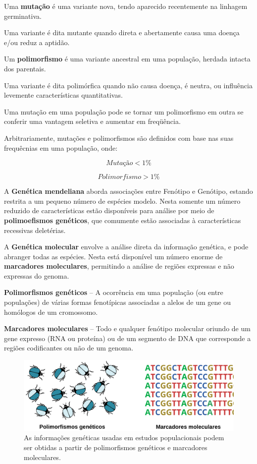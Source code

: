 \documentclass[
]{book}
\begin{document}
Uma \textbf{mutação} é uma variante nova, tendo aparecido recentemente na linhagem germinativa.

Uma variante é dita mutante quando direta e abertamente causa uma doença e/ou reduz a aptidão.

Um \textbf{polimorfismo} é uma variante ancestral em uma população, herdada intacta dos parentais.

Uma variante é dita polimórfica quando não causa doença, é neutra, ou influência levemente características quantitativas.

Uma mutação em uma população pode se tornar um polimorfismo em outra se conferir uma vantagem seletiva e aumentar em freqüência.

Arbitrariamente, mutações e polimorfismos são definidos com base nas suas frequêcnias em uma população, onde:

\[{Mutação} < 1 \%\]

\[{Polimorfismo} > 1 \%\]

A \textbf{Genética mendeliana} aborda associações entre Fenótipo e Genótipo, estando restrita a um pequeno número de espécies modelo. Nesta somente um número reduzido de características estão disponíveis para análise por meio de \textbf{polimoefismos genéticos}, que comumente estão associadas à características recessivas deletérias.

A \textbf{Genética molecular} envolve a análise direta da informação genética, e pode abranger todas as espécies. Nesta está disponível um número enorme de \textbf{marcadores moleculares}, permitindo a análise de regiões expressas e não expressas do genoma.

\textbf{Polimorfismos genéticos} -- A ocorrência em uma população (ou entre populações) de várias formas fenotípicas associadas a alelos de um gene ou homólogos de um cromossomo.

\textbf{Marcadores moleculares} -- Todo e qualquer fenótipo molecular oriundo de um gene expresso (RNA ou proteína) ou de um segmento de DNA que corresponde a regiões codificantes ou não de um genoma.

\begin{figure}

{\centering \includegraphics[width=600px]{figs/polimorfismos_marcadores} 

}

\caption{As informações genéticas usadas em estudos populacionais podem ser obtidas a partir de polimorfismos genéticos e marcadores moleculares.}\label{fig:polymarker}
\end{figure}
\end{document}
